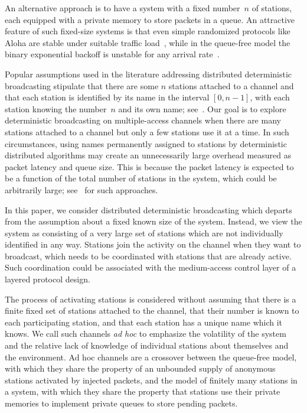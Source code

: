 \documentclass[11pt]{article}
\begin{document}
An alternative approach is to have a system with a fixed number~$n$ of stations, each equipped with a private memory to store packets in a queue.
An attractive feature of such fixed-size systems is that even simple randomized protocols like Aloha are stable under suitable traffic load~\cite{TsybakovM79}, while in the queue-free model the binary exponential backoff is unstable for any arrival rate~\cite{Aldous-TIT87}.

Popular assumptions used in the literature addressing distributed deterministic broadcasting stipulate that there are some $n$ stations attached to a channel and that each station is identified by its name in the interval $[0,n-1]$, with each station knowing the number~$n$ and its own name; see~\cite{AnantharamuCKR-INFOCOM10, AnantharamuCKR-SIROCCO11, AnantharamuCR-OPODIS09, ChlebusKR09, ChlebusKR-TALG12}.
Our goal is to explore deterministic broadcasting on multiple-access channels when there are many stations attached to a channel but only a few stations use it at a time.
In such circumstances, using names permanently assigned to stations by deterministic distributed algorithms may create an unnecessarily large overhead measured as packet latency and queue size.
This is because the  packet latency is expected to  be a function of the total number of stations in the system, which could be arbitrarily large; see~\cite{AnantharamuCKR-INFOCOM10, AnantharamuCKR-SIROCCO11} for such approaches.

In this paper, we consider distributed deterministic broadcasting which departs from the assumption about a fixed known size of the system.
Instead, we view the system as consisting of a very large set of stations which are not individually identified in any way.
Stations  join the activity on the channel when they want to broadcast, which needs to be coordinated with stations that are already active.
Such coordination could be associated with the medium-access control layer \cite{Keshav-book97} of a layered protocol design.

The process of activating stations is considered without assuming that there is a finite fixed set of stations attached to the channel, that their number is known to each participating station, and that each station has a unique name which it knows. 
We call such channels \emph{ad hoc} to emphasize the volatility of the system and the relative lack of knowledge of individual stations about themselves and the environment.
Ad hoc channels are a crossover between the queue-free model, with which they share the property of an unbounded supply of anonymous stations activated by injected packets, and the model of finitely many stations in a system, with which they share the property that stations use their private memories to implement private queues to store pending packets.
\end{document}
